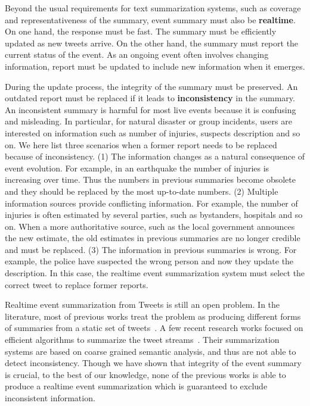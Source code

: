 \documentclass[envcountsame]{llncs}
\begin{document}
Beyond the usual requirements for text summarization systems, such as coverage and representativeness of the summary,  event summary must also be \textbf{realtime}. On one hand, the response must be fast. The summary must be efficiently updated as new tweets arrive. On the other hand, the summary must report the current status of the event. As an ongoing event often involves changing information, report must be updated to include new information when it emerges.

During the update process, the integrity of the summary must be preserved.  An outdated report must be replaced if it leads to \textbf{inconsistency} in the summary. An inconsistent summary is harmful for most live events because it is confusing and misleading. In particular, for natural disaster or group incidents,  users are interested on  information such as number of injuries, suspects description and so on. We here list three scenarios when a former report needs to be replaced because of inconsistency. (1) The information changes as a natural consequence of event evolution. For example, in an earthquake the number of injuries is increasing over time. Thus the numbers in previous summaries become obsolete and they should be replaced by the most up-to-date numbers. (2) Multiple information sources provide conflicting information. For example, the number of injuries is often estimated by several parties, such as  bystanders, hospitals and so on. When a more authoritative source, such as the local government announces the new estimate, the old estimates in previous summaries are no longer credible and must be replaced. (3) The information in previous summaries is wrong. For example, the police have suspected the wrong person and now they update the description. In this case, the realtime event summarization system must select the correct tweet to replace former reports.


Realtime event summarization from Tweets is still an open problem. In the literature, most of previous works treat the problem as producing different forms of summaries from a static set of tweets~\cite{Takamura2011Summarizing,Lin2012Generating,Rudra2015Extracting,Liu2016LEDS,Gillani2017Post}. A few recent research works focused on efficient algorithms to summarize the tweet streams~\cite{Shou2013Sumblr,Zubiaga2012Towards}. Their summarization systems are based on coarse grained semantic analysis, and thus are not able to detect inconsistency. Though we have shown that integrity of the event summary is crucial, to the best of our knowledge, none of the previous works is able to produce a realtime event summarization which is guaranteed to exclude inconsistent information.
\end{document}
